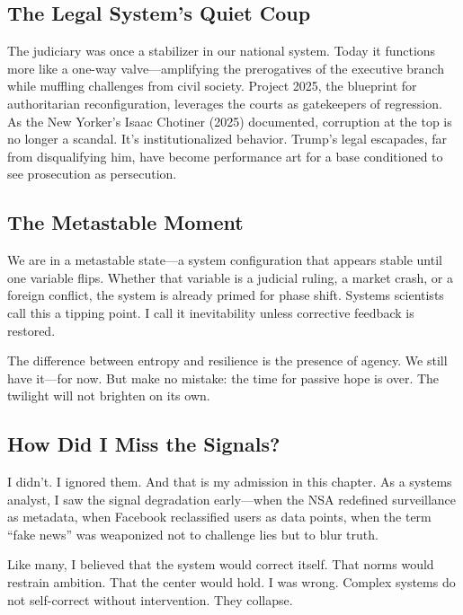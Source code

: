 \documentclass[
]{article}
\begin{document}
\subsection{The Legal System's Quiet Coup}\label{the-legal-systems-quiet-coup}

The judiciary was once a stabilizer in our national system. Today it functions more like a one-way valve---amplifying the prerogatives of the executive branch while muffling challenges from civil society. Project 2025, the blueprint for authoritarian reconfiguration, leverages the courts as gatekeepers of regression. As the New Yorker's Isaac Chotiner (2025) documented, corruption at the top is no longer a scandal. It's institutionalized behavior. Trump's legal escapades, far from disqualifying him, have become performance art for a base conditioned to see prosecution as persecution.

\subsection{The Metastable Moment}\label{the-metastable-moment}

We are in a metastable state---a system configuration that appears stable until one variable flips. Whether that variable is a judicial ruling, a market crash, or a foreign conflict, the system is already primed for phase shift. Systems scientists call this a tipping point. I call it inevitability unless corrective feedback is restored.

The difference between entropy and resilience is the presence of agency. We still have it---for now. But make no mistake: the time for passive hope is over. The twilight will not brighten on its own.

\subsection{How Did I Miss the Signals?}\label{how-did-i-miss-the-signals}

I didn't. I ignored them. And that is my admission in this chapter. As a systems analyst, I saw the signal degradation early---when the NSA redefined surveillance as metadata, when Facebook reclassified users as data points, when the term ``fake news'' was weaponized not to challenge lies but to blur truth.

Like many, I believed that the system would correct itself. That norms would restrain ambition. That the center would hold. I was wrong. Complex systems do not self-correct without intervention. They collapse.
\end{document}

